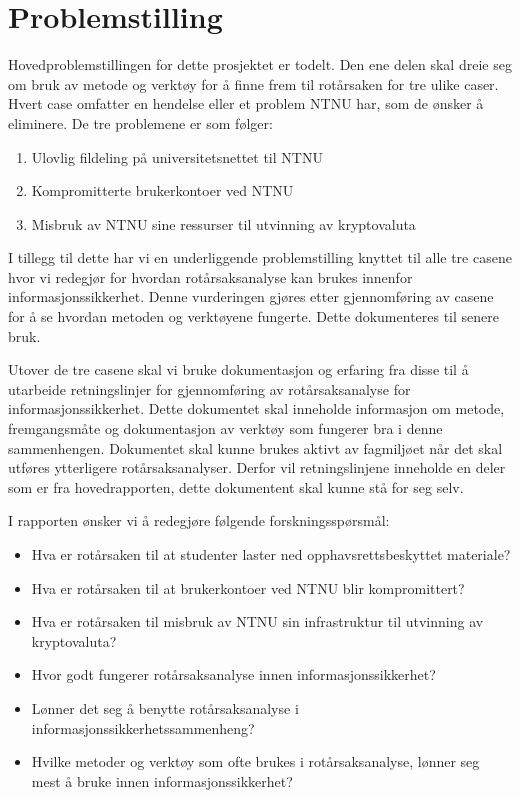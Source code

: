 \section{Problemstilling}

\label{sec:problemstilling}
Hovedproblemstillingen for dette prosjektet er todelt. Den ene delen skal dreie seg om bruk av metode og verktøy for å finne frem til rotårsaken for tre ulike caser. Hvert case omfatter en hendelse eller et problem NTNU har, som de ønsker å eliminere. De tre problemene er som følger: 

\begin{enumerate}
    \item Ulovlig fildeling på universitetsnettet til NTNU
    \item Kompromitterte brukerkontoer ved NTNU
    \item Misbruk av NTNU sine ressurser til utvinning av kryptovaluta
\end{enumerate}

I tillegg til dette har vi en underliggende problemstilling knyttet til alle tre casene hvor vi redegjør for hvordan rotårsaksanalyse kan brukes innenfor informasjonssikkerhet. Denne vurderingen gjøres etter gjennomføring av casene for å se hvordan metoden og verktøyene fungerte. Dette dokumenteres til senere bruk.

Utover de tre casene skal vi bruke dokumentasjon og erfaring fra disse til å utarbeide retningslinjer for gjennomføring av rotårsaksanalyse for informasjonssikkerhet. Dette dokumentet skal inneholde informasjon om metode, fremgangsmåte og dokumentasjon av verktøy som fungerer bra i denne sammenhengen. Dokumentet skal kunne brukes aktivt av fagmiljøet når det skal utføres ytterligere rotårsaksanalyser. Derfor vil retningslinjene inneholde en deler som er fra hovedrapporten, dette dokumentent skal kunne stå for seg selv.

I rapporten ønsker vi å redegjøre følgende forskningsspørsmål:

\begin{itemize}
    \item Hva er rotårsaken til at studenter laster ned opphavsrettsbeskyttet materiale?
    \item Hva er rotårsaken til at brukerkontoer ved NTNU blir kompromittert?
    \item Hva er rotårsaken til misbruk av NTNU sin infrastruktur til utvinning av kryptovaluta?
    \item Hvor godt fungerer rotårsaksanalyse innen informasjonssikkerhet?
    \item Lønner det seg å benytte rotårsaksanalyse i informasjonssikkerhetssammenheng?
    \item Hvilke metoder og verktøy som ofte brukes i rotårsaksanalyse, lønner seg mest å bruke innen informasjonssikkerhet?
\end{itemize}